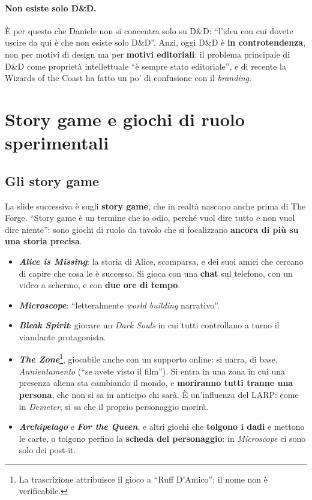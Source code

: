 \paragraph{Non esiste solo D\&D.} È per questo che Daniele non si concentra solo
su D\&D: ``l'idea con cui dovete uscire da qui è che non esiste solo D\&D''.
Anzi, oggi D\&D è \textbf{in controtendenza}, non per motivi di design ma per
\textbf{motivi editoriali}: il problema principale di D\&D come proprietà
intellettuale ``è sempre stato editoriale'', e di recente la Wizards of the Coast
ha fatto un po' di confusione con il \emph{branding}.

\section{Story game e giochi di ruolo sperimentali}
\label{a2:sec:gdr-story}

\subsection{Gli story game}



La slide successiva è sugli \textbf{story game}, che in realtà nascono anche
prima di The Forge. ``Story game è un termine che io odio, perché vuol dire tutto
e non vuol dire niente'': sono giochi di ruolo da tavolo che si focalizzano
\textbf{ancora di più su una storia precisa}.
\begin{itemize}
  \item \textbf{\emph{Alice is Missing}}: la storia di Alice, scomparsa, e dei
        suoi amici che cercano di capire che cosa le è successo. Si gioca con
        una \textbf{chat} sul telefono, con un video a schermo, e con
        \textbf{due ore di tempo}.
  \item \textbf{\emph{Microscope}}: ``letteralmente \emph{world building}
        narrativo''.
  \item \textbf{\emph{Bleak Spirit}}: giocare un \emph{Dark Souls} in cui tutti
        controllano a turno il viandante protagonista.
  \item \textbf{\emph{The Zone}}\footnote{La trascrizione attribuisce il gioco a
        ``Ruff D'Amico''; il nome non è verificabile.}, giocabile anche con un
        supporto online: si narra, di base, \emph{Annientamento} (``se avete
        visto il film''). Si entra in una zona in cui una presenza aliena sta
        cambiando il mondo, e \textbf{moriranno tutti tranne una persona}, che
        non si sa in anticipo chi sarà. È un'influenza del LARP: come in
        \emph{Demeter}, si sa che il proprio personaggio morirà.
  \item \textbf{\emph{Archipelago}} e \textbf{\emph{For the Queen}}, e altri
        giochi che \textbf{tolgono i dadi} e mettono le carte, o tolgono
        perfino la \textbf{scheda del personaggio}: in \emph{Microscope} ci sono
        solo dei post-it.
\end{itemize}

